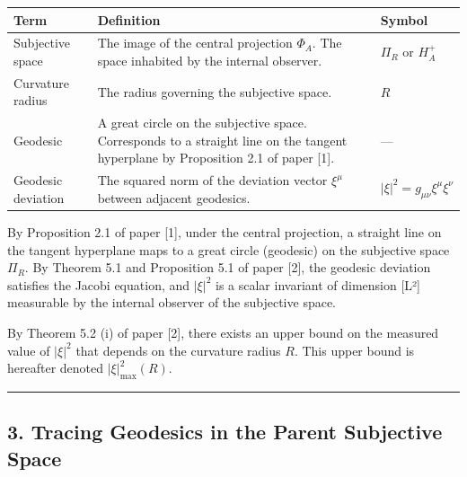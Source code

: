 \documentclass[a4paper,11pt]{article}
\theoremstyle{definition}
\begin{document}
{\def\LTcaptype{none} %
\begin{longtable}[]{@{}
  >{\raggedright\arraybackslash}p{}
  >{\raggedright\arraybackslash}p{}
  >{\raggedright\arraybackslash}p{}@{}}
\toprule\noalign{}
\begin{minipage}[b]{\linewidth}\raggedright
Term
\end{minipage} & \begin{minipage}[b]{\linewidth}\raggedright
Definition
\end{minipage} & \begin{minipage}[b]{\linewidth}\raggedright
Symbol
\end{minipage} \\
\midrule\noalign{}
\endhead
\bottomrule\noalign{}
\endlastfoot
Subjective space & The image of the central projection \(\Phi_A\). The space inhabited by the internal observer. & \(\Pi_R\) or \(H^+_A\) \\
Curvature radius & The radius governing the subjective space. & \(R\) \\
Geodesic & A great circle on the subjective space. Corresponds to a straight line on the tangent hyperplane by Proposition 2.1 of paper {[}1{]}. & --- \\
Geodesic deviation & The squared norm of the deviation vector \(\xi^\mu\) between adjacent geodesics. & \(\vert\xi\vert^2 = g_{\mu\nu}\xi^\mu\xi^\nu\) \\
\end{longtable}
}

By Proposition 2.1 of paper {[}1{]}, under the central projection, a straight line on the tangent hyperplane maps to a great circle (geodesic) on the subjective space \(\Pi_R\). By Theorem 5.1 and Proposition 5.1 of paper {[}2{]}, the geodesic deviation satisfies the Jacobi equation, and \(|\xi|^2\) is a scalar invariant of dimension {[}L²{]} measurable by the internal observer of the subjective space.

By Theorem 5.2 (i) of paper {[}2{]}, there exists an upper bound on the measured value of \(|\xi|^2\) that depends on the curvature radius \(R\). This upper bound is hereafter denoted \(|\xi|^2_{\max}(R)\).

\begin{center}\rule{0.5\linewidth}{0.5pt}\end{center}

\subsection{3. Tracing Geodesics in the Parent Subjective Space}\label{tracing-geodesics-in-the-parent-subjective-space}
\end{document}
